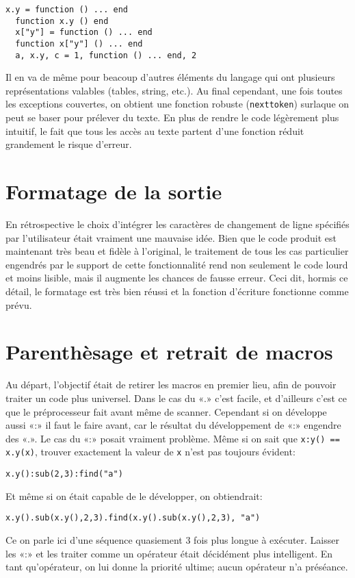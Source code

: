 \documentclass{article}
\begin{document}
\begin{lstlisting}[style=lua]
  x.y = function () ... end
  function x.y () end
  x["y"] = function () ... end
  function x["y"] () ... end
  a, x.y, c = 1, function () ... end, 2
\end{lstlisting}

Il en va de même pour beacoup d'autres éléments du langage qui ont plusieurs représentations valables (tables, string, etc.). Au final cependant, une fois toutes les exceptions couvertes, on obtient une fonction robuste (\texttt{nexttoken}) surlaque on peut se baser pour prélever du texte. En plus de rendre le code légèrement plus intuitif, le fait que tous les accès au texte partent d'une fonction réduit grandement le risque d'erreur.

\section{Formatage de la sortie}
En rétrospective le choix d'intégrer les caractères de changement de ligne spécifiés par l'utilisateur était vraiment une mauvaise idée. Bien que le code produit est maintenant très beau et fidèle à l'original, le traitement de tous les cas particulier engendrés par le support de cette fonctionnalité rend non seulement le code lourd et moins lisible, mais il augmente les chances de fausse erreur. Ceci dit, hormis ce détail, le formatage est très bien réussi et la fonction d'écriture fonctionne comme prévu.

\section{Parenthèsage et retrait de macros}
Au départ, l'objectif était de retirer les macros en premier lieu, afin de pouvoir traiter un code plus universel. Dans le cas du «.» c'est facile, et d'ailleurs c'est ce que le préprocesseur fait avant même de scanner. Cependant si on développe aussi «:» il faut le faire avant, car le résultat du développement de «:» engendre des «.». Le cas du «:» posait vraiment problème. Même si on sait que \texttt{x:y() == x.y(x)}, trouver exactement la valeur de \texttt{x} n'est pas toujours évident:
\begin{lstlisting}[style=lua]
  x.y():sub(2,3):find("a")
\end{lstlisting}
Et même si on était capable de le développer, on obtiendrait:
\begin{lstlisting}[style=lua]
  x.y().sub(x.y(),2,3).find(x.y().sub(x.y(),2,3), "a")
\end{lstlisting}
Ce on parle ici d'une séquence quasiement 3 fois plus longue à exécuter. Laisser les «:» et les traiter comme un opérateur était décidément plus intelligent. En tant qu'opérateur, on lui donne la priorité ultime; aucun opérateur n'a préséance.
\end{document}
